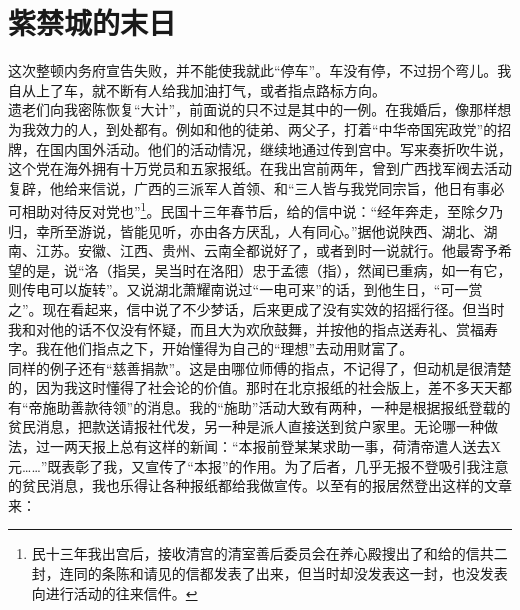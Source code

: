 \fancyhead[RO]{} %
\fancyhead[LE]{} %
\chapter*{紫禁城的末日}
\thispagestyle{empty}
这次整顿内务府宣告失败，并不能使我就此“停车”。车没有停，不过拐个弯儿。我自从上了车，就不断有人给我加油打气，或者指点路标方向。\\

遗老们向我密陈恢复“大计”，前面说的只不过是其中的一例。在我婚后，像那样想为我效力的人，到处都有。例如和他的徒弟、两父子，打着“中华帝国宪政党”的招牌，在国内国外活动。他们的活动情况，继续地通过传到宫中。写来奏折吹牛说，这个党在海外拥有十万党员和五家报纸。在我出宫前两年，曾到广西找军阀去活动复辟，他给来信说，广西的三派军人首领、和“三人皆与我党同宗旨，他日有事必可相助对待反对党也”\footnote{民十三年我出宫后，接收清宫的清室善后委员会在养心殿搜出了和给的信共二封，连同的条陈和请见的信都发表了出来，但当时却没发表这一封，也没发表向进行活动的往来信件。}。民国十三年春节后，给的信中说：“经年奔走，至除夕乃归，幸所至游说，皆能见听，亦由各方厌乱，人有同心。”据他说陕西、湖北、湖南、江苏。安徽、江西、贵州、云南全都说好了，或者到时一说就行。他最寄予希望的是，说“洛（指吴，吴当时在洛阳）忠于孟德（指），然闻已重病，如一有它，则传电可以旋转”。又说湖北萧耀南说过“一电可来”的话，到他生日，“可一赏之”。现在看起来，信中说了不少梦话，后来更成了没有实效的招摇行径。但当时我和对他的话不仅没有怀疑，而且大为欢欣鼓舞，并按他的指点送寿礼、赏福寿字。我在他们指点之下，开始懂得为自己的“理想”去动用财富了。\\

同样的例子还有“慈善捐款”。这是由哪位师傅的指点，不记得了，但动机是很清楚的，因为我这时懂得了社会论的价值。那时在北京报纸的社会版上，差不多天天都有“帝施助善款待领”的消息。我的“施助”活动大致有两种，一种是根据报纸登载的贫民消息，把款送请报社代发，另一种是派人直接送到贫户家里。无论哪一种做法，过一两天报上总有这样的新闻：“本报前登某某求助一事，荷清帝遣人送去X元……”既表彰了我，又宣传了“本报”的作用。为了后者，几乎无报不登吸引我注意的贫民消息，我也乐得让各种报纸都给我做宣传。以至有的报居然登出这样的文章来：\\

